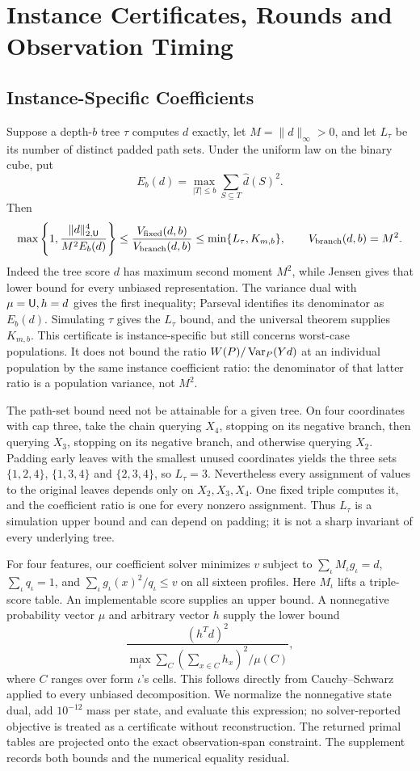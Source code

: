 \section{Instance Certificates, Rounds and Observation Timing}\label{app:instances}
\subsection{Instance-Specific Coefficients}
Suppose a depth-$b$ tree $\tau$ computes $d$ exactly, let $M=\|d\|_\infty>0$, and let $L_\tau$ be its number of distinct padded path sets. Under the uniform law on the binary cube, put
\[
 E_b(d)=\max_{|T|\le b}\sum_{S\subseteq T}\widehat d(S)^2.
\]
Then
\begin{equation}
 \max\left\{1,\frac{\|d\|_{2,\mathsf U}^4}{M^2 E_b(d)}\right\}
 \le \frac{V_{\rm fixed}(d,b)}{V_{\rm branch}(d,b)}
 \le \min\{L_\tau,K_{m,b}\},\qquad V_{\rm branch}(d,b)=M^2.
 \label{eq:instanceinterval}
\end{equation}
Indeed the tree score $d$ has maximum second moment $M^2$, while Jensen gives that lower bound for every unbiased representation. The variance dual with $\mu=\mathsf U,h=d$ gives the first inequality; Parseval identifies its denominator as $E_b(d)$. Simulating $\tau$ gives the $L_\tau$ bound, and the universal theorem supplies $K_{m,b}$. This certificate is instance-specific but still concerns worst-case populations. It does not bound the ratio $W(P)/\operatorname{Var}_P(Yd)$ at an individual population by the same instance coefficient ratio: the denominator of that latter ratio is a population variance, not $M^2$.

The path-set bound need not be attainable for a given tree. On four
coordinates with cap three, take the chain querying $X_4$, stopping on its
negative branch, then querying $X_3$, stopping on its negative branch,
and otherwise querying $X_2$. Padding early leaves with the smallest unused
coordinates yields the three sets $\{1,2,4\}$, $\{1,3,4\}$ and
$\{2,3,4\}$, so $L_\tau=3$. Nevertheless every assignment of values to
the original leaves depends only on $X_2,X_3,X_4$. One fixed triple
computes it, and the coefficient ratio is one for every nonzero assignment.
Thus $L_\tau$ is a simulation upper bound and can depend on padding; it
is not a sharp invariant of every underlying tree.

For four features, our coefficient solver minimizes $v$ subject to $\sum_\iota M_\iota g_\iota=d$, $\sum_\iota q_\iota=1$, and $\sum_\iota g_\iota(x)^2/q_\iota\le v$ on all sixteen profiles. Here $M_\iota$ lifts a triple-score table. An implementable score supplies an upper bound. A nonnegative probability vector $\mu$ and arbitrary vector $h$ supply the lower bound
\[
 \frac{(h^Td)^2}{\max_\iota\sum_C (\sum_{x\in C}h_x)^2/\mu(C)},
\]
where $C$ ranges over form $\iota$'s cells. This follows directly from Cauchy--Schwarz applied to every unbiased decomposition. We normalize the nonnegative state dual, add $10^{-12}$ mass per state, and evaluate this expression; no solver-reported objective is treated as a certificate without reconstruction. The returned primal tables are projected onto the exact observation-span constraint. The supplement records both bounds and the numerical equality residual.

